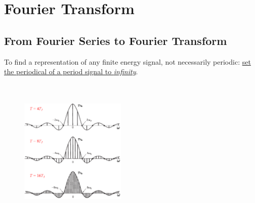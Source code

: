 \section{Fourier Transform}
\subsection{From Fourier Series to Fourier Transform}
\begin{ex}{}
    To find a representation of any finite energy signal, not necessarily periodic: \underline{set the periodical of a period signal to \textit{infinity}}.\\
    
    \\\\
    
    \begin{figure}
        \includegraphics[width = 0.45\textwidth]{images/sinc_with_inc_T1.eps} 
        \vspace{-3cm} 
    \end{figure}
    

\end{ex}
